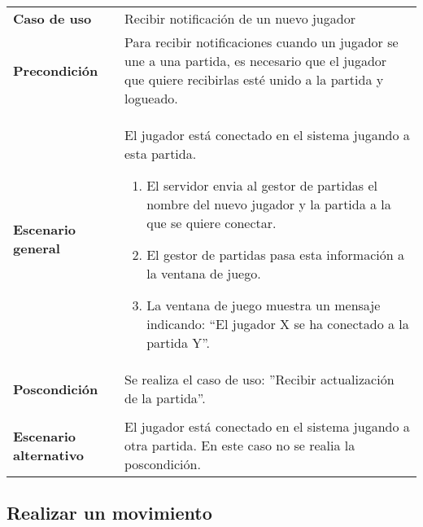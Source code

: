 {\footnotesize
\begin{tabularx}{0.95\textwidth}{p{}|X}

\textbf{Caso de uso} & Recibir notificación de un nuevo jugador \\

\textbf{Precondición} & Para recibir notificaciones cuando un jugador se une a
una partida, es necesario que el jugador que quiere recibirlas esté unido a la
partida y logueado. \\

\textbf{Escenario general} & El jugador está conectado en el sistema jugando a
esta partida.\begin{enumerate}

\item El servidor envia al gestor de partidas el nombre del nuevo jugador y la
partida a la que se quiere conectar.
\item El gestor de partidas pasa esta información a la ventana de juego.
\item La ventana de juego muestra un mensaje indicando: ``El jugador X se
ha conectado a la partida Y''.

\end{enumerate} \\

\textbf{Poscondición} & Se realiza el caso de uso: ''Recibir actualización de la
partida''. \\ \\

\textbf{Escenario alternativo} & El jugador está conectado en el sistema jugando
a otra partida. En este caso no se realia la poscondición.





\end{tabularx}
}

\subsection{Realizar un movimiento}

